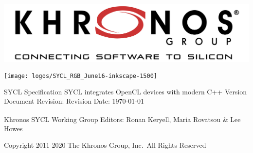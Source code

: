 \documentclass[10pt,twoside]{report}
\begin{document}

\ifx\showtodos\true
\listoftodos
\fi

\begin{titlepage}

\begin{center}

\begin{center}
\hfill\includegraphics[width=0.4\hsize]{logos/Khronos_Tagline_500px_June18}
\end{center}
\vskip 2cm

\begin{center}
\texttt{[image: logos/SYCL\_RGB\_June16-inkscape-1500]}
\end{center}

\vskip 1.5cm

{\Large SYCL\texttrademark{} Specification}
\vskip 0.5cm
{\Large SYCL\texttrademark{} integrates OpenCL\texttrademark{} devices
  with modern C++}
\vskip 1cm
{ Version \SYCLVERSION}
\vskip 0.2cm
{ Document Revision: \DOCUMENTVERSION}
\vskip 0.2cm
{ Revision Date: \today}


\vskip 1cm
{Khronos\textsuperscript{\textregistered} SYCL\texttrademark{}
  Working Group}
\vskip 0.2cm
{Editors: Ronan Keryell, Maria Rovatsou \& Lee Howes}

\vskip 1cm
\vbox{\hrulefill}
\vbox{Copyright 2011-2020 The Khronos\textregistered{} Group, Inc.\ All
  Rights Reserved}
\end{center}

\end{titlepage}
\end{document}
